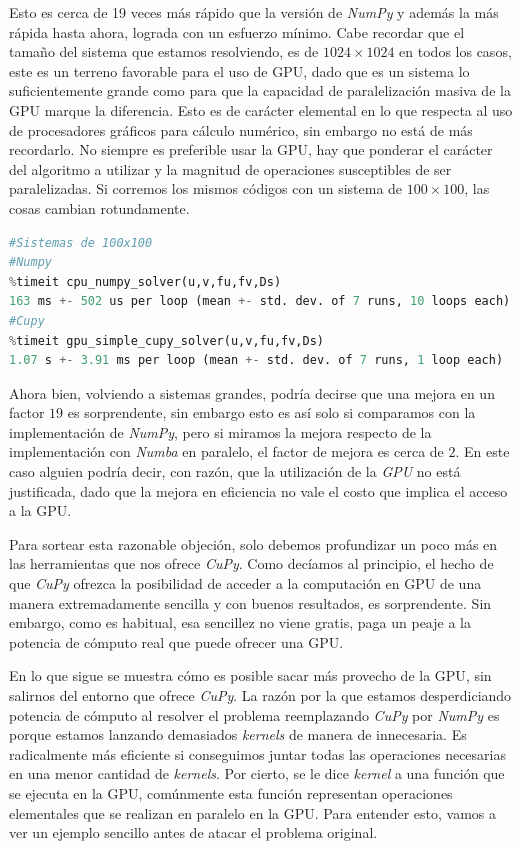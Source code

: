 Esto es cerca de 19 veces más rápido que la versión de \textit{NumPy} y además la más rápida hasta ahora, lograda con un esfuerzo mínimo. Cabe recordar que 
el tamaño del sistema que estamos resolviendo, es de $1024\times1024$ en todos los casos, este es un terreno favorable para el uso de GPU, dado que 
es un sistema lo suficientemente grande como para que la capacidad de paralelización masiva de la GPU marque la diferencia. Esto es de carácter elemental 
en lo que respecta al uso de procesadores gráficos para cálculo numérico, sin embargo no está de más recordarlo. No siempre es preferible usar la GPU,
hay que ponderar el carácter del algoritmo a utilizar y la magnitud de operaciones susceptibles de ser paralelizadas. Si corremos los mismos códigos 
con un sistema de $100\times100$, las cosas cambian rotundamente.
\begin{lstlisting}[language=Python,label = {lst:cupy}]
#Sistemas de 100x100
#Numpy
%timeit cpu_numpy_solver(u,v,fu,fv,Ds)
163 ms +- 502 us per loop (mean +- std. dev. of 7 runs, 10 loops each)
#Cupy
%timeit gpu_simple_cupy_solver(u,v,fu,fv,Ds)
1.07 s +- 3.91 ms per loop (mean +- std. dev. of 7 runs, 1 loop each)
\end{lstlisting}

Ahora bien, volviendo a sistemas grandes, podría decirse que una mejora en un factor $19$ es sorprendente, sin embargo esto es así solo si comparamos
con la implementación de \textit{NumPy}, pero si miramos la mejora respecto de la implementación con \textit{Numba} en paralelo, el factor de 
mejora es cerca de $2$. En este caso alguien podría decir, con razón, que la utilización de la \textit{GPU} no está justificada, dado que la 
mejora en eficiencia no vale el costo que implica el acceso a la GPU.  

Para sortear esta razonable objeción, solo debemos profundizar un poco más en las herramientas que nos ofrece \textit{CuPy}. Como decíamos al principio, 
el hecho de que \textit{CuPy} ofrezca la posibilidad de acceder a la computación en GPU de una manera extremadamente sencilla y con buenos resultados, es 
sorprendente. Sin embargo, como es habitual, esa sencillez no viene gratis, paga un peaje a la potencia de cómputo real que puede ofrecer una GPU. 

En lo que sigue se muestra cómo es posible sacar más provecho de la GPU, sin salirnos del entorno que ofrece \textit{CuPy}. La razón por la que estamos 
desperdiciando potencia de cómputo al resolver el problema reemplazando \textit{CuPy} por \textit{NumPy} es porque estamos lanzando demasiados 
\textit{kernels} de manera de innecesaria. Es radicalmente más eficiente si conseguimos juntar todas las operaciones necesarias en una menor 
cantidad de \textit{kernels}. Por cierto, se le dice \textit{kernel} a una función que se ejecuta en la GPU, comúnmente esta función 
representan operaciones elementales que se realizan en paralelo en la GPU. Para entender esto, vamos a ver un ejemplo sencillo antes de atacar el 
problema original.

